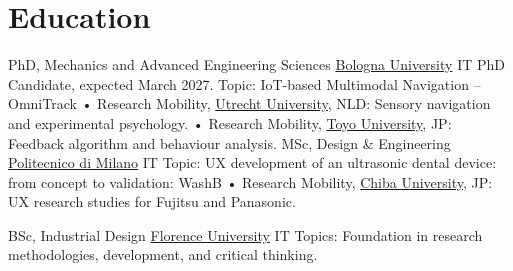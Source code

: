 \vspace{+0.5em}
\section{Education}

{PhD, Mechanics and Advanced Engineering Sciences}
{\href{https://www.unibo.it/}{\color{blue}Bologna University}}
{IT}
{PhD Candidate, expected March 2027. Topic: IoT-based Multimodal Navigation – OmniTrack\newline
• Research Mobility, \href{https://www.uu.nl/en}{\color{blue}Utrecht University}, NLD: Sensory navigation and experimental psychology.\newline
• Research Mobility, \href{https://www.iniad.org/en/}{\color{blue}Toyo University}, JP: Feedback algorithm and behaviour analysis.
}
{MSc, Design \& Engineering}
{\href{https://www.polimi.it/en}{\color{blue}Politecnico di Milano}}
{IT}
{{Topic: UX development of an ultrasonic dental device: from concept to validation: WashB}\newline
• Research Mobility, \href{https://www.chiba-u.ac.jp/e/}{\color{blue}Chiba University}, JP: UX research studies for Fujitsu and Panasonic.
} 

{BSc, Industrial Design}
{\href{https://www.unifi.it/changelang-eng.html}{\color{blue}Florence University}}
{IT}
{Topics: Foundation in research methodologies, development, and critical thinking.}
